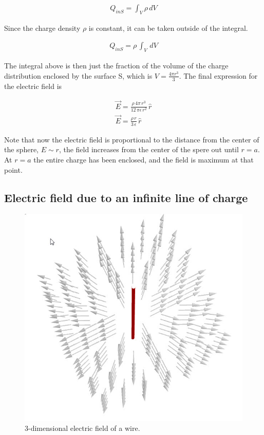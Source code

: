 \documentclass{ximera}
\begin{document}
\begin{eqnarray}
Q_{inS}=\int_V \rho \, dV
\end{eqnarray}

Since the charge density $\rho$ is constant, it  can be taken outside of the integral.


\begin{eqnarray}
Q_{inS}=\rho \, \int_V \, dV
\end{eqnarray}

The integral above is then just the fraction of the volume of the charge distribution enclosed by the surface S, which is $V=\frac{4 \pi r^3}{3}$. The final expression for the electric field is 


\begin{eqnarray}
 \vec{E}  = \frac{\rho \, 4 \pi \, r^3}{12 \, \pi  \epsilon \, r^2} \, \hat{r} \\
 \vec{E}  = \frac{\rho \, r}{3  \, \epsilon } \, \hat{r}
\end{eqnarray}

Note that now the electric field is proportional to the distance from the center of the sphere, $E\sim r$, the field increases from the center of the spere out until $r=a$. At $r=a$ the entire charge has been enclosed, and the field is maximum at that point.

\subsection{Electric field due to an infinite line of charge}


\begin{figure}[htbp]
\begin{center}
\includegraphics[scale=0.5]{../jpg/infiniteLineChargeField3D.jpg}
\end{center}
\caption{3-dimensional electric field of a wire.}
\label{GausLine}
\end{figure}
\end{document}
